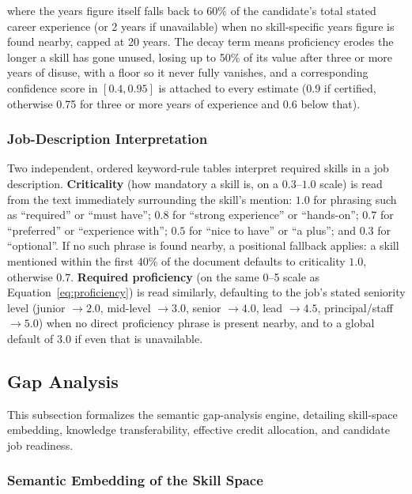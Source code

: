 \documentclass[11pt,a4paper]{article}
\begin{document}
where the years figure itself falls back to 60\% of the candidate's total stated career experience (or 2 years if unavailable) when no skill-specific years figure is found nearby, capped at 20 years. The decay term means proficiency erodes the longer a skill has gone unused, losing up to 50\% of its value after three or more years of disuse, with a floor so it never fully vanishes, and a corresponding confidence score in $[0.4, 0.95]$ is attached to every estimate (0.9 if certified, otherwise 0.75 for three or more years of experience and 0.6 below that).

\subsubsection{Job-Description Interpretation}

Two independent, ordered keyword-rule tables interpret required skills in a job description. \textbf{Criticality} (how mandatory a skill is, on a $0.3$--$1.0$ scale) is read from the text immediately surrounding the skill's mention: $1.0$ for phrasing such as ``required'' or ``must have''; $0.8$ for ``strong experience'' or ``hands-on''; $0.7$ for ``preferred'' or ``experience with''; $0.5$ for ``nice to have'' or ``a plus''; and $0.3$ for ``optional''. If no such phrase is found nearby, a positional fallback applies: a skill mentioned within the first 40\% of the document defaults to criticality $1.0$, otherwise $0.7$. \textbf{Required proficiency} (on the same 0--5 scale as Equation~\ref{eq:proficiency}) is read similarly, defaulting to the job's stated seniority level (junior $\to 2.0$, mid-level $\to 3.0$, senior $\to 4.0$, lead $\to 4.5$, principal/staff $\to 5.0$) when no direct proficiency phrase is present nearby, and to a global default of $3.0$ if even that is unavailable.

\subsection{Gap Analysis}
\label{sec:mod2-gap}

This subsection formalizes the semantic gap-analysis engine, detailing skill-space embedding, knowledge transferability, effective credit allocation, and candidate job readiness.

\subsubsection{Semantic Embedding of the Skill Space}
\end{document}
